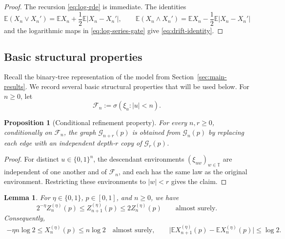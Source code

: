 \documentclass[12pt]{amsart}
\numberwithin{equation}{section}
\theoremstyle{plain}
\newtheorem{proposition}[theorem]{Proposition}
\newtheorem{lemma}[theorem]{Lemma}
\theoremstyle{definition}
\newcommand{\E}{\mathbb E}
\begin{document}
\begin{proof}
The recursion \eqref{eq:log-rde} is immediate.  The identities
\[
 \E(X_n\vee X_n')=\E X_n+\frac12\E|X_n-X_n'|,
 \qquad
 \E(X_n\wedge X_n')=\E X_n-\frac12\E|X_n-X_n'|
\]
and the logarithmic maps in \eqref{eq:log-series-gate} give
\eqref{eq:drift-identity}.
\end{proof}

\subsection{Basic structural properties}
\label{sec:canonical-refinement-coupling}

Recall the binary-tree representation of the model from
Section~\ref{sec:main-results}.  We record several basic structural properties
that will be used below.  For $n\ge0$, let
\[
 \mathcal F_n:=\sigma(\xi_u:|u|<n).
\]

\begin{proposition}[Conditional refinement property]
\label{prop:conditional-refinement}
For every $n,r\ge0$, conditionally on $\mathcal F_n$, the graph
$\mathcal G_{n+r}(p)$ is obtained from $\mathcal G_n(p)$ by replacing each
edge with an independent depth-$r$ copy of $\mathcal G_r(p)$.
\end{proposition}

\begin{proof}
For distinct $u\in\{0,1\}^n$, the descendant environments
$(\xi_{uw})_{w\in\mathbb T}$ are independent of one another and of
$\mathcal F_n$, and each has the same law as the original environment.
Restricting these environments to $|w|<r$ gives the claim.
\end{proof}

\begin{lemma}
\label{lem:deterministic-bound}
For $\eta\in\{0,1\}$, $p\in[0,1]$, and $n\ge0$, we have
\begin{equation}
 2^{-\eta}Z_n^{(\eta)}(p)
 \le Z_{n+1}^{(\eta)}(p)
 \le 2Z_n^{(\eta)}(p)
 \qquad\text{almost surely}.
 \label{eq:adjacent-Z}
\end{equation}
Consequently,
\begin{equation}
\begin{aligned}
 -\eta n\log2
 \le X_n^{(\eta)}(p)\le n\log2
 \quad\text{almost surely},\qquad
 \big|\E X_{n+1}^{(\eta)}(p)-\E X_n^{(\eta)}(p)\big|
 \le\log2.
\end{aligned}
 \label{eq:deterministic-bound}
\end{equation}
\end{lemma}
\end{document}
